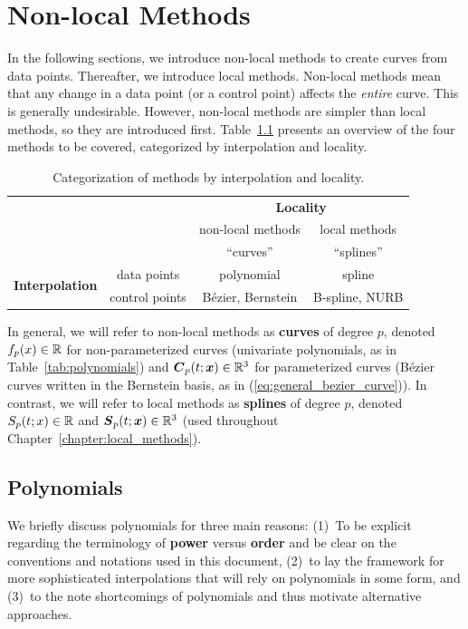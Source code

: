 
\chapter{Non-local Methods}
In the following sections, we introduce non-local methods
to create curves from data points.  Thereafter, we
introduce local methods.
Non-local methods mean that any change in a data point (or a control point) 
affects 
the {\em entire} curve.  This is generally undesirable.  
However, non-local methods are simpler than local methods, so they 
are introduced first.  Table~\ref{tab:concept_map} presents an overview
of the four methods to be covered, categorized by interpolation and 
locality.

\begin{table}[htb]
\caption{Categorization of methods by interpolation and locality.}
\begin{center}
\begin{tabular}{cc||c|c}
& & \multicolumn{2}{c}{\bf Locality} \\
& & non-local methods & local methods \\
& & ``curves'' & ``splines'' \\
\hline \hline
\multirow{2}{*}{\bf Interpolation} & data points & polynomial & spline \\ \cline{2-4}
& control points & B\'ezier, Bernstein & B-spline, NURB \\
\end{tabular}
\end{center}
\label{tab:concept_map}
\end{table}
In general, we will refer to non-local methods as {\bf curves} of 
degree $p$, denoted
$f_p(x) \in \mathbb{R}$ for non-parameterized curves (univariate polynomials, as
in Table~\ref{tab:polynomials}) and 
$\mbox{\boldmath $C$}_p(t; \mbox{\boldmath $x$}) \in \mathbb{R}^3$ for parameterized curves (B\'ezier curves written
in the Bernstein basis, as in (\ref{eq:general_bezier_curve})).  
In contrast, we will refer to local methods as {\bf splines} of 
degree $p$, denoted $S_p(t; x) \in \mathbb{R}$ and 
$\mbox{\boldmath $S$}_p(t; \mbox{\boldmath $x$}) \in \mathbb{R}^3$ (used throughout Chapter~\ref{chapter:local_methods}).

\section{Polynomials}
We briefly discuss polynomials for three main reasons:  
(1)~To be explicit
regarding the terminology of {\bf power} versus {\bf order} and be clear
on the conventions and notations used in this document, 
(2)~to lay the framework
for more sophisticated interpolations that will rely on polynomials in some 
form, and 
(3)~to
the  note shortcomings of polynomials and thus motivate alternative 
approaches.

